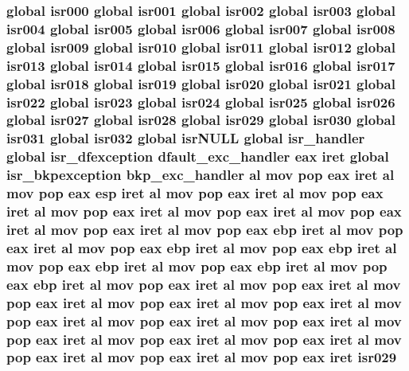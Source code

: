\subsubsection[{\texorpdfstring{isr029}{isr029}}]{\setlength{\rightskip}{0pt plus 5cm}global {\bf isr000} global {\bf isr001} global {\bf isr002} global {\bf isr003} global {\bf isr004} global {\bf isr005} global {\bf isr006} global {\bf isr007} global {\bf isr008} global {\bf isr009} global {\bf isr010} global {\bf isr011} global {\bf isr012} global {\bf isr013} global {\bf isr014} global {\bf isr015} global {\bf isr016} global {\bf isr017} global {\bf isr018} global {\bf isr019} global {\bf isr020} global {\bf isr021} global {\bf isr022} global {\bf isr023} global {\bf isr024} global {\bf isr025} global {\bf isr026} global {\bf isr027} global {\bf isr028} global isr029 global {\bf isr030} global {\bf isr031} global isr032 global isr\+N\+U\+LL global isr\+\_\+handler global {\bf isr\+\_\+dfexception} {\bf dfault\+\_\+exc\+\_\+handler} eax iret global {\bf isr\+\_\+bkpexception} {\bf bkp\+\_\+exc\+\_\+handler} {\bf al} {\bf mov} pop eax iret {\bf al} {\bf mov} pop eax esp iret {\bf al} {\bf mov} pop eax iret {\bf al} {\bf mov} pop eax iret {\bf al} {\bf mov} pop eax iret {\bf al} {\bf mov} pop eax iret {\bf al} {\bf mov} pop eax iret {\bf al} {\bf mov} pop eax iret {\bf al} {\bf mov} pop eax ebp iret {\bf al} {\bf mov} pop eax iret {\bf al} {\bf mov} pop eax ebp iret {\bf al} {\bf mov} pop eax ebp iret {\bf al} {\bf mov} pop eax ebp iret {\bf al} {\bf mov} pop eax ebp iret {\bf al} {\bf mov} pop eax ebp iret {\bf al} {\bf mov} pop eax iret {\bf al} {\bf mov} pop eax iret {\bf al} {\bf mov} pop eax iret {\bf al} {\bf mov} pop eax iret {\bf al} {\bf mov} pop eax iret {\bf al} {\bf mov} pop eax iret {\bf al} {\bf mov} pop eax iret {\bf al} {\bf mov} pop eax iret {\bf al} {\bf mov} pop eax iret {\bf al} {\bf mov} pop eax iret {\bf al} {\bf mov} pop eax iret {\bf al} {\bf mov} pop eax iret {\bf al} {\bf mov} pop eax iret {\bf al} {\bf mov} pop eax iret isr029}\hypertarget{isrs_8as_aab2b7832b3e55d1be2a1d3f9b9ad9494}{}\label{isrs_8as_aab2b7832b3e55d1be2a1d3f9b9ad9494}
